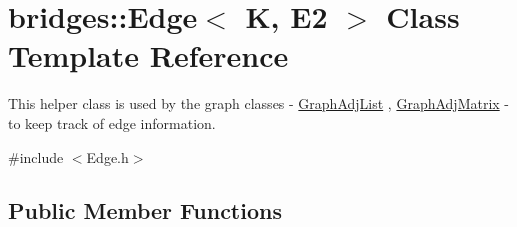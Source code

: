 \hypertarget{classbridges_1_1_edge}{}\section{bridges\+::Edge$<$ K, E2 $>$ Class Template Reference}
\label{classbridges_1_1_edge}


This helper class is used by the graph classes -\/ \mbox{\hyperlink{classbridges_1_1_graph_adj_list}{Graph\+Adj\+List}} , \mbox{\hyperlink{classbridges_1_1_graph_adj_matrix}{Graph\+Adj\+Matrix}} -\/ to keep track of edge information.  




{\ttfamily \#include $<$Edge.\+h$>$}

\subsection*{Public Member Functions}
